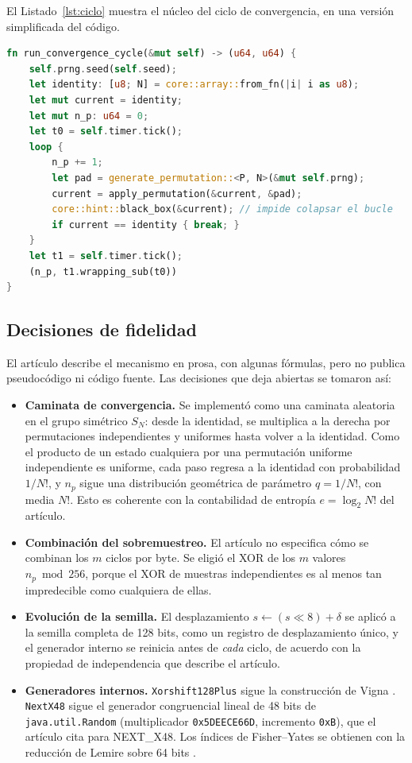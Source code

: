 El Listado~\ref{lst:ciclo} muestra el núcleo del ciclo de convergencia, en una versión simplificada del código.

\begin{lstlisting}[language=Rust, caption={Ciclo de convergencia de la referencia (simplificado)}, label={lst:ciclo}]
fn run_convergence_cycle(&mut self) -> (u64, u64) {
    self.prng.seed(self.seed);
    let identity: [u8; N] = core::array::from_fn(|i| i as u8);
    let mut current = identity;
    let mut n_p: u64 = 0;
    let t0 = self.timer.tick();
    loop {
        n_p += 1;
        let pad = generate_permutation::<P, N>(&mut self.prng);
        current = apply_permutation(&current, &pad);
        core::hint::black_box(&current); // impide colapsar el bucle
        if current == identity { break; }
    }
    let t1 = self.timer.tick();
    (n_p, t1.wrapping_sub(t0))
}
\end{lstlisting}

\subsection{Decisiones de fidelidad}

El artículo describe el mecanismo en prosa, con algunas fórmulas, pero no publica pseudocódigo ni código fuente. Las decisiones que deja abiertas se tomaron así:

\begin{itemize}
    \item \textbf{Caminata de convergencia.} Se implementó como una caminata aleatoria en el grupo simétrico $S_N$: desde la identidad, se multiplica a la derecha por permutaciones independientes y uniformes hasta volver a la identidad. Como el producto de un estado cualquiera por una permutación uniforme independiente es uniforme, cada paso regresa a la identidad con probabilidad $1/N!$, y $n_p$ sigue una distribución geométrica de parámetro $q = 1/N!$, con media $N!$. Esto es coherente con la contabilidad de entropía $e = \log_2 N!$ del artículo.
    \item \textbf{Combinación del sobremuestreo.} El artículo no especifica cómo se combinan los $m$ ciclos por byte. Se eligió el XOR de los $m$ valores $n_p \bmod 256$, porque el XOR de muestras independientes es al menos tan impredecible como cualquiera de ellas.
    \item \textbf{Evolución de la semilla.} El desplazamiento $s \leftarrow (s \ll 8) + \delta$ se aplicó a la semilla completa de 128 bits, como un registro de desplazamiento único, y el generador interno se reinicia antes de \emph{cada} ciclo, de acuerdo con la propiedad de independencia que describe el artículo.
    \item \textbf{Generadores internos.} \texttt{Xorshift128Plus} sigue la construcción de Vigna \cite{Vigna2017FurtherGenerators}. \texttt{NextX48} sigue el generador congruencial lineal de 48 bits de \texttt{java.util.Random} (multiplicador \texttt{0x5DEECE66D}, incremento \texttt{0xB}), que el artículo cita para NEXT\_X48. Los índices de Fisher--Yates se obtienen con la reducción de Lemire sobre 64 bits \cite{Lemire2019FastInterval}.
\end{itemize}

